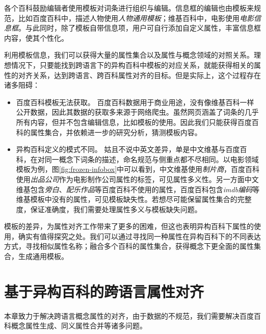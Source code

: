 各个百科鼓励编辑者使用模板对词条进行组织与编辑。信息框的编辑也由模板来规范，比如百度百科中，描述人物使用\textit{人物通用模板}；维基百科中，电影使用\textit{电影信息框}。与此同时，除了模板自带信息项，用户可自行添加自定义属性，丰富信息框内容，使其个性化。

利用模板信息，我们可以获得大量的属性集合以及属性与概念领域的对照关系。理想情况下，只要能找到跨语言下的异构百科中模板的对应关系，就能获得相关的属性的对齐关系，达到跨语言、跨百科属性对齐的目标。但是实际上，这个过程存在诸多阻碍：
\begin{itemize}
\item {\heiti 百度百科模板无法获取。} 百度百科数据用于商业用途，没有像维基百科一样公开数据，因此其数据的获取多来源于网络爬虫。虽然网页涵盖了词条的几乎所有内容，但并不包含编辑信息，比如模板的使用。因此我们只能获得百度百科的属性集合，并依赖进一步的研究分析，猜测模板内容。
\item {\heiti 异构百科定义的模式不同。} 姑且不说中英文差异，单是中文维基与百度百科，在对同一概念下词条的描述，命名规范与侧重点都不尽相同。以电影领域模板为例，图\ref{fig:frozen-infobox}中可以看到，中文维基使用\textit{制片商}，百度百科使用\textit{出品公司}作为电影制作公司属性的标签，可见{\heiti 属性多义性}。另一方面中文维基包含\textit{旁白}、\textit{配乐作品}等百度百科不使用的属性，百度百科包含\textit{imdb编码}等维基模板中没有的属性，可见{\heiti 模板缺失性}。若想尽可能保留属性集合的完整度，保证准确度，我们需要处理属性多义与模板缺失问题。
\end{itemize}

模板的差异，为属性对齐工作带来了更多的困难，但这也表明异构百科下属性的使用，确实有值得探究之处。我们可以通过寻找同一种属性在异构百科下的不同表达方式，寻找相似属性名称；融合多个百科的属性集合，获得概念下更全面的属性集合，生成通用模板。

\section{基于异构百科的跨语言属性对齐}
\label{sec:property-matching}

本章致力于解决跨语言概念属性的对齐，由于数据的不规范，我们需要解决百度百科概念属性生成、同义属性合并等诸多问题。


